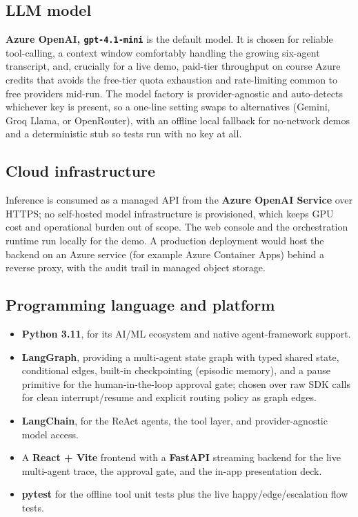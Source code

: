 \documentclass[11pt,a4paper]{article}
\let\oldsubsection\subsection
\renewcommand{\subsection}{\needspace{5\baselineskip}\oldsubsection}
\begin{document}
\subsection*{LLM model}
\textbf{Azure OpenAI, \texttt{gpt-4.1-mini}} is the default model. It is chosen for reliable tool-calling, a context window comfortably handling the growing six-agent transcript, and, crucially for a live demo, paid-tier throughput on course Azure credits that avoids the free-tier quota exhaustion and rate-limiting common to free providers mid-run. The model factory is provider-agnostic and auto-detects whichever key is present, so a one-line setting swaps to alternatives (Gemini, Groq Llama, or OpenRouter), with an offline local fallback for no-network demos and a deterministic stub so tests run with no key at all.

\subsection*{Cloud infrastructure}
Inference is consumed as a managed API from the \textbf{Azure OpenAI Service} over HTTPS; no self-hosted model infrastructure is provisioned, which keeps GPU cost and operational burden out of scope. The web console and the orchestration runtime run locally for the demo. A production deployment would host the backend on an Azure service (for example Azure Container Apps) behind a reverse proxy, with the audit trail in managed object storage.

\subsection*{Programming language and platform}
\begin{itemize}
  \item \textbf{Python 3.11}, for its AI/ML ecosystem and native agent-framework support.
  \item \textbf{LangGraph}, providing a multi-agent state graph with typed shared state, conditional edges, built-in checkpointing (episodic memory), and a pause primitive for the human-in-the-loop approval gate; chosen over raw SDK calls for clean interrupt/resume and explicit routing policy as graph edges.
  \item \textbf{LangChain}, for the ReAct agents, the tool layer, and provider-agnostic model access.
  \item A \textbf{React + Vite} frontend with a \textbf{FastAPI} streaming backend for the live multi-agent trace, the approval gate, and the in-app presentation deck.
  \item \textbf{pytest} for the offline tool unit tests plus the live happy/edge/escalation flow tests.
\end{itemize}
\end{document}
